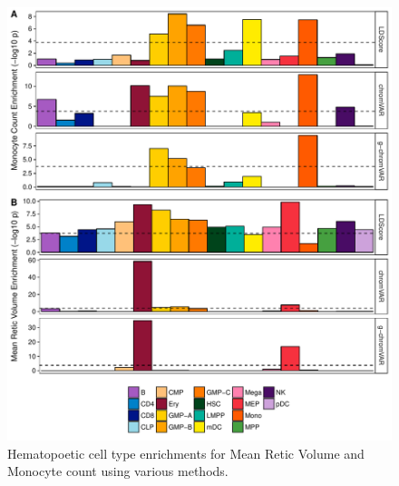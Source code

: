 \documentclass{article}\usepackage[]{graphicx}\usepackage[]{color}
\makeatletter
\def\maxwidth{ %
  \ifdim\Gin@nat@width>\linewidth
    \linewidth
  \else
    \Gin@nat@width
  \fi
}
\newenvironment{knitrout}{}{} %
\makeatother
\begin{document}
\begin{knitrout}
\color{fgcolor}\begin{figure}[H]

{\centering \includegraphics[width=\maxwidth]{figure/barplots-1} 

}

\caption[Hematopoetic cell type enrichments for Mean Retic Volume and Monocyte count using various methods]{Hematopoetic cell type enrichments for Mean Retic Volume and Monocyte count using various methods.}\label{fig:barplots}
\end{figure}


\end{knitrout}
\end{document}
